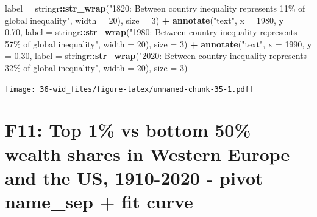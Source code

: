 \documentclass[
  xelatex, ja=standard]{bxjsbook}
\newenvironment{Shaded}{\begin{snugshade}}{\end{snugshade}}
\newcommand{\AttributeTok}[1]{\textcolor[rgb]{0.13,0.29,0.53}{#1}}
\newcommand{\DecValTok}[1]{\textcolor[rgb]{0.00,0.00,0.81}{#1}}
\newcommand{\FloatTok}[1]{\textcolor[rgb]{0.00,0.00,0.81}{#1}}
\newcommand{\FunctionTok}[1]{\textcolor[rgb]{0.13,0.29,0.53}{\textbf{#1}}}
\newcommand{\NormalTok}[1]{#1}
\newcommand{\SpecialCharTok}[1]{\textcolor[rgb]{0.81,0.36,0.00}{\textbf{#1}}}
\newcommand{\StringTok}[1]{\textcolor[rgb]{0.31,0.60,0.02}{#1}}
\theoremstyle{definition}
\theoremstyle{definition}
\theoremstyle{definition}
\theoremstyle{definition}
\theoremstyle{remark}
\begin{document}
\begin{Shaded}
\begin{Highlighting}[]
      \AttributeTok{label =}\NormalTok{ stringr}\SpecialCharTok{::}\FunctionTok{str\_wrap}\NormalTok{(}\StringTok{"1820: Between country inequality represents 11\% }
\StringTok{                                of global inequality"}\NormalTok{, }\AttributeTok{width =} \DecValTok{20}\NormalTok{), }\AttributeTok{size =} \DecValTok{3}\NormalTok{) }\SpecialCharTok{+} 
  \FunctionTok{annotate}\NormalTok{(}\StringTok{"text"}\NormalTok{, }\AttributeTok{x =} \DecValTok{1980}\NormalTok{, }\AttributeTok{y =} \FloatTok{0.70}\NormalTok{, }
      \AttributeTok{label =}\NormalTok{ stringr}\SpecialCharTok{::}\FunctionTok{str\_wrap}\NormalTok{(}\StringTok{"1980: Between country inequality represents 57\% }
\StringTok{                                of global inequality"}\NormalTok{, }\AttributeTok{width =} \DecValTok{20}\NormalTok{), }\AttributeTok{size =} \DecValTok{3}\NormalTok{) }\SpecialCharTok{+}
  \FunctionTok{annotate}\NormalTok{(}\StringTok{"text"}\NormalTok{, }\AttributeTok{x =} \DecValTok{1990}\NormalTok{, }\AttributeTok{y =} \FloatTok{0.30}\NormalTok{, }
      \AttributeTok{label =}\NormalTok{ stringr}\SpecialCharTok{::}\FunctionTok{str\_wrap}\NormalTok{(}\StringTok{"2020: Between country inequality represents 32\% }
\StringTok{                                of global inequality"}\NormalTok{, }\AttributeTok{width =} \DecValTok{20}\NormalTok{), }\AttributeTok{size =} \DecValTok{3}\NormalTok{)}
\end{Highlighting}
\end{Shaded}

\texttt{[image: 36-wid\_files/figure-latex/unnamed-chunk-35-1.pdf]}

\hypertarget{f11-top-1-vs-bottom-50-wealth-shares-in-western-europe-and-the-us-1910-2020---pivot-name_sep-fit-curve}{%
\section{F11: Top 1\% vs bottom 50\% wealth shares in Western Europe and the US, 1910-2020 - pivot name\_sep + fit curve}\label{f11-top-1-vs-bottom-50-wealth-shares-in-western-europe-and-the-us-1910-2020---pivot-name_sep-fit-curve}}
\end{document}
